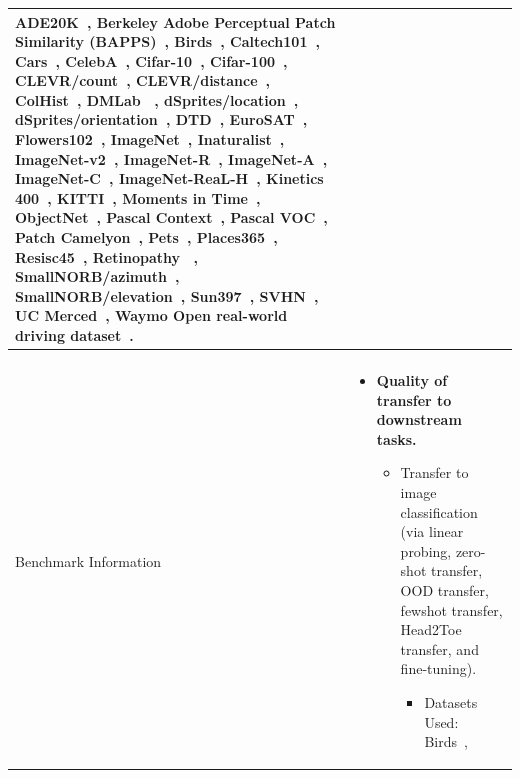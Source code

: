 \documentclass{article}
\begin{document}
{\begin{longtable}[c]{ p{} | p{} }
ADE20K~\citep{zhou2017scene},
Berkeley Adobe Perceptual Patch Similarity (BAPPS)~\citep{zhang2018perceptual},
Birds~\citep{WahCUB_200_2011},
Caltech101~\citep{li_andreeto_ranzato_perona_2022},
Cars~\citep{KrauseStarkDengFei-Fei_3DRR2013},
CelebA~\citep{liu2015faceattributes},
Cifar-10~\citep{krizhevsky2009learning},
Cifar-100~\citep{krizhevsky2009learning},
CLEVR/count~\citep{johnson2017clevr},
CLEVR/distance~\citep{johnson2017clevr},
ColHist~\citep{kather2016multi},
DMLab ~\citep{beattie2016deepmind},
dSprites/location~\citep{dsprites17},
dSprites/orientation~\citep{dsprites17},
DTD~\citep{cimpoi2014describing},
EuroSAT~\citep{helber2019eurosat},
Flowers102~\citep{nilsback2008automated},
ImageNet~\citep{deng2009imagenet},
Inaturalist~\citep{cui2018large},
ImageNet-v2~\citep{recht2019imagenet_v2},
ImageNet-R~\citep{hendrycks2020imagenet_r}, 
ImageNet-A~\citep{hendrycks2021imagenet_a},
ImageNet-C~\citep{hendrycks2019benchmarking},
ImageNet-ReaL-H~\citep{tran2022plex},
Kinetics 400~\citep{kay2017kinetics},
KITTI~\citep{geiger2013vision},
Moments in Time~\citep{monfort2019moments},
ObjectNet~\citep{barbu2019objectnet}, 
Pascal Context~\citep{mottaghi2014role},
Pascal VOC~\citep{everingham2010pascal},
Patch Camelyon~\citep{teh2019metric},
Pets~\citep{parkhi2012cats},
Places365~\citep{zhou2017places},
Resisc45~\citep{cheng2017remote},
Retinopathy ~\citep{kaggle-diabetic-retinopathy},
SmallNORB/azimuth~\citep{lecun2004learning},
SmallNORB/elevation~\citep{lecun2004learning},
Sun397~\citep{xiao2010sun},
SVHN~\citep{netzer2011reading},
UC Merced~\citep{yang2010bag},
Waymo Open real-world driving dataset~\citep{sun2020scalability}.
\\
\hline 
\pagebreak  
\toprule
\multicolumn{2}{c}{\textbf{Evaluation Results}}  \\ 
\toprule
\multicolumn{1}{l|}{Benchmark Information} & 
\vspace{-5pt}
\begin{itemize}
    \addtolength{\itemsep}{-1ex}
    \item \textbf{Quality of transfer to downstream tasks.}
    \begin{itemize}
    \addtolength{\itemsep}{-1ex}
    \item Transfer to image classification (via linear probing, zero-shot transfer, OOD transfer, fewshot transfer, Head2Toe transfer, and fine-tuning).
    \begin{itemize}
    \addtolength{\itemsep}{-1ex}
    \item Datasets Used:
            Birds~\citep{WahCUB_200_2011},

\end{itemize}
\end{itemize}
\end{itemize}
\end{longtable}}
\end{document}
